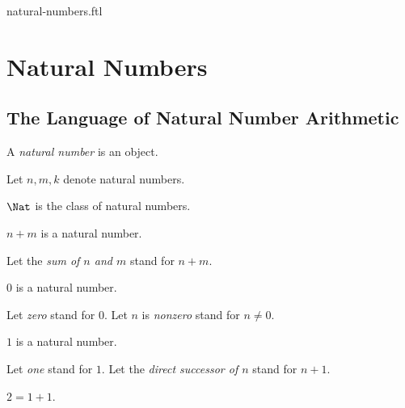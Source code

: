 \documentclass{naproche-library}
\begin{document}
\begin{smodule}{natural-numbers.ftl}


  \section{Natural Numbers}

  \subsection{The Language of Natural Number Arithmetic}

  \begin{signature}[forthel,id=NatNumberSig]
    A \emph{natural number} is an object.

    Let $n,m,k$ denote natural numbers.
  \end{signature}

  \begin{definition}[forthel,id=NatDef]
    $\Nat$ is the class of natural numbers.
  \end{definition}

  \begin{signature}[forthel,id=PlusSig]
    $n\plus m$ is a natural number.

    Let the \emph{sum of $n$ and $m$} stand for $n\plus m$.
  \end{signature}


  \begin{signature}[forthel,id=ZeroSig]
    $0$ is a natural number.

    Let \emph{zero} stand for $0$.
    Let $n$ is \emph{nonzero} stand for $n\neq0$.
  \end{signature}

  \begin{signature}[forthel,id=OneSig]
    $1$ is a natural number.

    Let \emph{one} stand for $1$.
    Let the \emph{direct successor of $n$} stand for $n\plus1$.
  \end{signature}

  \begin{definition}[forthel,id=TwoSig]
    $2=1\plus1$.


\end{definition}
\end{smodule}
\end{document}
